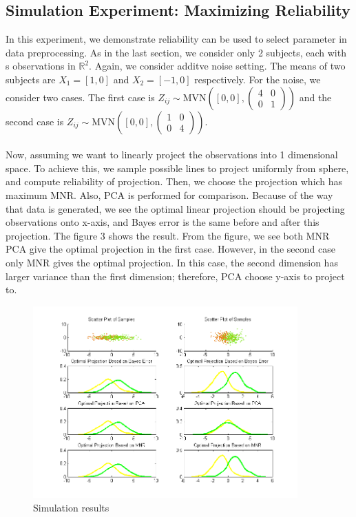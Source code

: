 \documentclass{article}
\begin{document}
\subsection{Simulation Experiment: Maximizing Reliability}
\noindent In this experiment, we demonstrate reliability can be used to select parameter in data preprocessing. As in the last section, we consider only 2 subjects, each with s observations in $\mathbb{R}^2$. Again, we consider additve noise setting. The means of two subjects are $X_1=[1,0]$ and $X_2=[-1,0]$ respectively. For the noise, we consider two cases. The first case is $Z_{ij}\sim\text{MVN}([0,0],(\begin{matrix} 4 & 0 \\ 0 & 1\end{matrix}))$ and the second case is $Z_{ij}\sim\text{MVN}([0,0],(\begin{matrix} 1 & 0 \\ 0 & 4\end{matrix}))$. \\
\\
Now, assuming we want to linearly project the observations into 1 dimensional space. To achieve this, we sample possible lines to project uniformly from sphere, and compute reliability of projection. Then, we choose the projection which has maximum MNR. Also, PCA is performed for comparison. Because of the way that data is generated, we see the optimal linear projection should be projecting observations onto x-axis, and Bayes error is the same before and after this projection. The figure 3 shows the result. From the figure, we see both MNR PCA give the optimal projection in the first case. However, in the second case only MNR gives the optimal projection. In this case, the second dimension has larger variance than the first dimension; therefore, PCA choose y-axis to project to.

\begin{figure}[t!]
\begin{center}
\includegraphics[width=4in]{parameter_selection_2sub}
\end{center}
\caption{Simulation results}
\end{figure}
\end{document}
